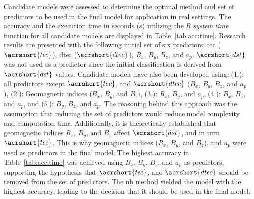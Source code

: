 \let\LaTeXcline\cline\documentclass[sn-mathphys-num]{sn-jnl}\let\cline\LaTeXcline
\begin{document}
Candidate models were assessed to determine the optimal method and set of predictors to be used in the final model for application in real settings. The accuracy and the execution time in seconds ($s$) utilizing the \textit{R} \textit{system.time} function for all candidate models are displayed in Table~\ref{tab:acc:time}. Research results are presented with the following initial set of six predictors: \acrlong{tec} ($\acrshort{tec}$), \acrlong{dtec} ($\acrshort{dtec}$), $B_{x}$, $B_{y}$, $B_{z}$, and $a_{p}$. $\acrshort{dst}$ was not used as a predictor since the initial classification is derived from $\acrshort{dst}$ values. Candidate models have also been developed using: (1.): all predictors except $\acrshort{tec}$, and $\acrshort{dtec}$ ($B_{x}$, $B_{y}$, $B_{z}$, and $a_{p}$), (2.): Geomagnetic indices ($B_{x}$, $B_{y}$, and $B_{z}$), (3.): $B_{x}$, $B_{y}$, and $a_{p}$, (4.): $B_{x}$, $B_{z}$, and $a_{p}$, and (5.): $B_{y}$, $B_{z}$, and $a_{p}$. The reasoning behind this approach was the assumption that reducing the set of predictors would reduce model complexity and computation time. Additionally, it is theoretically established that geomagnetic indices $B_{x}$, $B_{y}$, and $B_{z}$ affect $\acrshort{dst}$, and in turn $\acrshort{tec}$. This is why geomagnetic indices ($B_{x}$, $B_{y}$, and $B_{z}$), and $a_{p}$ were used as predictors in the final model. The highest accuracy in Table~\ref{tab:acc:time} was achieved using $B_{x}$, $B_{y}$, $B_{z}$, and $a_{p}$ as predictors, supporting the hypothesis that $\acrshort{tec}$, and $\acrshort{dtec}$ should be removed from the set of predictors. The \acrfull{nb} method yielded the model with the highest accuracy, leading to the decision that it should be used in the final model.
\end{document}
